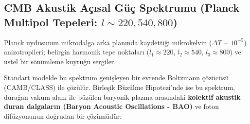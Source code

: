 \subsection{CMB Akustik Açısal Güç Spektrumu (Planck Multipol Tepeleri: \texorpdfstring{$l \sim 220, 540, 800$}{l ~ 220, 540, 800})}
\label{sec:helyum_ve_cmb_spektrumu}
Planck uydusunun mikrodalga arka planında kaydettiği mikrokelvin ($\Delta T \sim 10^{-5}$) anizotropileri; belirgin harmonik tepe noktaları ($l_1 \approx 220$, $l_2 \approx 540$, $l_3 \approx 800$) ve üstel bir sönümleme kuyruğu sergiler.

Standart modelde bu spektrum genişleyen bir evrende Boltzmann çözücüsü (CAMB/CLASS) ile çözülür. Birleşik Büzülme Hipotezi'nde ise bu spektrum, durağan vakum alanı ile büzülen baryonik plazma arasındaki \textbf{kolektif akustik duran dalgaların (Baryon Acoustic Oscillations - BAO)} ve foton difüzyonunun doğrudan bir çözümüdür:
